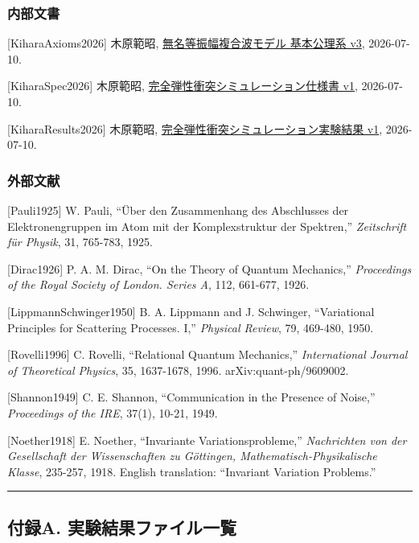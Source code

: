 \documentclass[
  a4paper,
]{article}
\begin{document}
\subsubsection{内部文書}\label{ux5185ux90e8ux6587ux66f8}

{[}KiharaAxioms2026{]} 木原範昭,
\href{基本公理系.md}{無名等振幅複合波モデル 基本公理系 v3}, 2026-07-10.

{[}KiharaSpec2026{]} 木原範昭,
\href{完全弾性衝突シミュレーション仕様書\%20v1.md}{完全弾性衝突シミュレーション仕様書
v1}, 2026-07-10.

{[}KiharaResults2026{]} 木原範昭,
\href{完全弾性衝突シミュレーション実験結果\%20v1.md}{完全弾性衝突シミュレーション実験結果
v1}, 2026-07-10.

\subsubsection{外部文献}\label{ux5916ux90e8ux6587ux732e}

{[}Pauli1925{]} W. Pauli, ``Über den Zusammenhang des Abschlusses der
Elektronengruppen im Atom mit der Komplexstruktur der Spektren,''
\emph{Zeitschrift für Physik}, 31, 765-783, 1925.

{[}Dirac1926{]} P. A. M. Dirac, ``On the Theory of Quantum Mechanics,''
\emph{Proceedings of the Royal Society of London. Series A}, 112,
661-677, 1926.

{[}LippmannSchwinger1950{]} B. A. Lippmann and J. Schwinger,
``Variational Principles for Scattering Processes. I,'' \emph{Physical
Review}, 79, 469-480, 1950.

{[}Rovelli1996{]} C. Rovelli, ``Relational Quantum Mechanics,''
\emph{International Journal of Theoretical Physics}, 35, 1637-1678,
1996. arXiv:quant-ph/9609002.

{[}Shannon1949{]} C. E. Shannon, ``Communication in the Presence of
Noise,'' \emph{Proceedings of the IRE}, 37(1), 10-21, 1949.

{[}Noether1918{]} E. Noether, ``Invariante Variationsprobleme,''
\emph{Nachrichten von der Gesellschaft der Wissenschaften zu Göttingen,
Mathematisch-Physikalische Klasse}, 235-257, 1918. English translation:
``Invariant Variation Problems.''

\begin{center}\rule{0.5\linewidth}{0.5pt}\end{center}

\subsection{付録A.
実験結果ファイル一覧}\label{ux4ed8ux9332a.-ux5b9fux9a13ux7d50ux679cux30d5ux30a1ux30a4ux30ebux4e00ux89a7}
\end{document}
